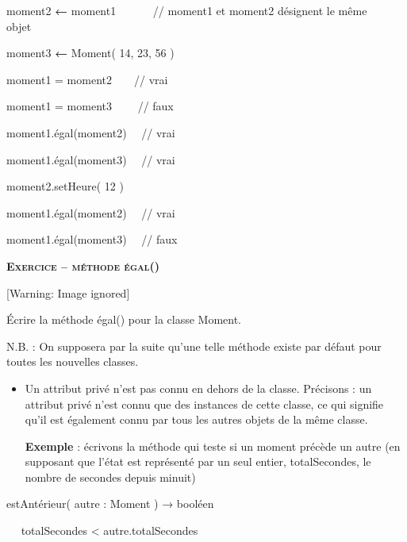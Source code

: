 {\sffamily
moment2 \textbf{←}\textbf{ }moment1 \ \ \ \ \ \ // moment1 et moment2
désignent le même objet\ \ }

{\sffamily
moment3 \textbf{←}\textbf{ } Moment( 14, 23, 56
)}

{\sffamily
{} moment1 = moment2\ \ \ \ // vrai}

{\sffamily
{} moment1 = moment3 \ \ \ \ // faux}

{\sffamily
{} moment1.égal(moment2) \ \ // vrai}

{\sffamily
{} moment1.égal(moment3) \ \ // vrai}

{\sffamily
moment2.setHeure( 12 )}

{\sffamily
{} moment1.égal(moment2) \ \ // vrai}

{\sffamily
{} moment1.égal(moment3) \ \ // faux}


\bigskip

{\sffamily\bfseries\scshape
Exercice – méthode égal()}

\begin{center}
 [Warning: Image ignored] %

\end{center}
{
Écrire la méthode égal() pour la classe Moment.}


\bigskip

{
N.B. : On supposera par la suite qu'une telle méthode
existe par défaut pour toutes les nouvelles classes.}

\liststyleListv
\begin{itemize}
\item {
Un attribut privé n'est pas connu en dehors de la
classe. Précisons : un attribut privé n'est connu que
des instances de cette classe, ce qui signifie qu'il
est également connu par tous les autres objets de la même
classe.

\textbf{Exemple} : écrivons la méthode qui teste si un moment précède un
autre (en supposant que l'état est représenté par un
seul entier, totalSecondes, le nombre de secondes depuis minuit)}
\end{itemize}
{\sffamily
{} estAntérieur( autre : Moment ) → booléen}

{\sffamily
\ \  totalSecondes {\textless}
autre.totalSecondes}

